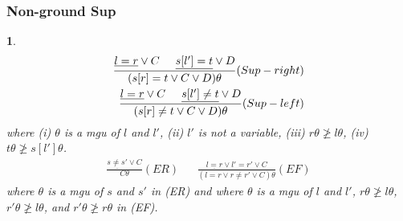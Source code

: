 \documentclass[9pt]{extarticle}
\theoremstyle{theoremstyle}
\newtheorem*{blue}{}
\begin{document}
\begin{multicols}{3}
\begin{minipage}[t]{.30\textwidth}
\subsubsection*{Non-ground Sup}
\begin{blue}
\begin{align*}
	\frac{\underline{l=r} \lor C \hspace{.5cm} \underline{s[l']=t} \lor D}{(s[r]=t \lor C \lor D)\theta} (Sup-right)\\
	\frac{\underline{l=r} \lor C \hspace{.5cm} \underline{s[l']\not=t} \lor D}{(s[r]\not=t \lor C \lor D)\theta} (Sup-left)\\
\end{align*}
where (i) $\theta$ is a mgu of $l$ and $l'$, (ii) $l'$ is not a variable, (iii) $r\theta \not\geq l\theta$, (iv) $t\theta\not\geq s[l']\theta$.
\begin{align*}
	\frac{\underline{s\not= s'} \lor C}{C\theta} (ER) && \frac{\underline{l=r} \lor l'=r' \lor C}{(l=r \lor r\not= r' \lor C)\theta} (EF)
\end{align*}
where $\theta$ is a mgu of $s$ and $s'$ in (ER) and where $\theta$ is a mgu of $l$ and $l'$, $r\theta \not\geq l\theta$, $r'\theta \not\geq l\theta$, and $r'\theta \not\geq r\theta$ in (EF).
\end{blue}

\end{minipage}


\end{multicols}
\end{document}

